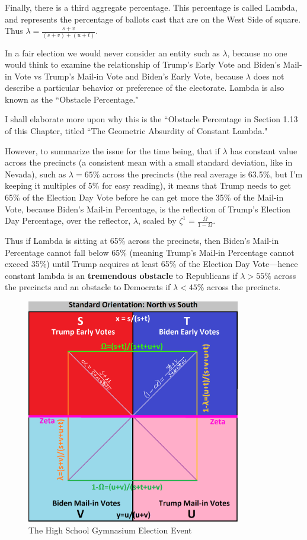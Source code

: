 \documentclass[preprint,13pt]{elsarticle}
\begin{document}
Finally, there is a third aggregate percentage. This percentage is called Lambda, and represents the percentage of ballots cast that are on the West Side of square. Thus $\lambda=\frac{s+v}{(s+v)+(u+t)}$.

In a fair election we would never consider an entity such as $\lambda$, because no one would think to examine the relationship of Trump's Early Vote and Biden's Mail-in Vote vs Trump's Mail-in Vote and Biden's Early Vote, because $\lambda$ does not describe a particular behavior or preference of the electorate. Lambda is also known as the ``Obstacle Percentage." 

I shall elaborate more upon why this is the ``Obstacle Percentage in Section 1.13 of this Chapter, titled ``The Geometric Absurdity of Constant Lambda." 

However, to summarize the issue for the time being, that if $\lambda$ has constant value across the precincts (a consistent mean with a small standard deviation, like in Nevada), such as $\lambda=65\%$ across the precincts (the real average is 63.5\%, but I'm keeping it multiples of 5\% for easy reading), it means that Trump needs to get 65\% of the Election Day Vote before he can get more the 35\% of the Mail-in Vote, because Biden's Mail-in Percentage, is the reflection of Trump's Election Day Percentage, over the reflector, $\lambda$, scaled by $\zeta^{1}=\frac{\Omega}{1-\Omega}$. 

Thus if Lambda is sitting at 65\% across the precincts, then Biden's Mail-in Percentage cannot fall below 65\% (meaning Trump's Mail-in Percentage cannot exceed 35\%) until Trump acquires at least 65\% of the Election Day Vote---hence constant lambda is an \textbf{tremendous obstacle} to Republicans if $\lambda>55\%$ across the precincts and an obstacle to Democrats if $\lambda<45\%$ across the precincts.

\begin{figure}[bp!]
\begin{center}
\caption{The High School Gymnasium Election Event}
\includegraphics[width=265pt]{North vs South.png}
\end{center}
\end{figure}
\newpage
\end{document}
